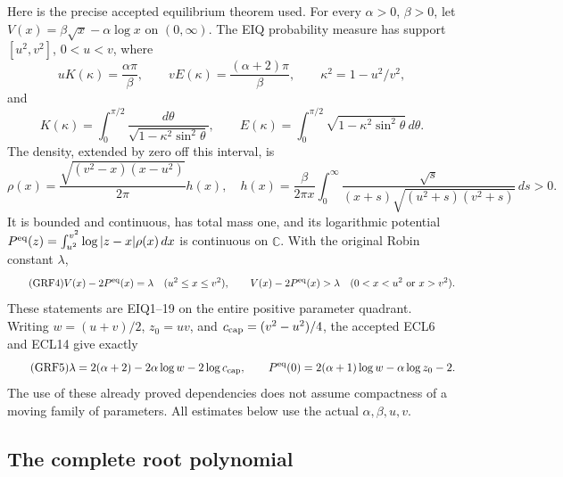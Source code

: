 \documentclass[11pt,a4paper]{article}
\begin{document}
Here is the precise accepted equilibrium theorem used. For every
$\alpha>0$, $\beta>0$, let
$V(x)=\beta\sqrt x-\alpha\log x$ on $(0,\infty)$.
The EIQ probability measure has support $[u^2,v^2]$, $0<u<v$, where
\begin{equation*}\tag{GRF2}\label{GRF:endpoints}
 uK(\kappa)=\frac{\alpha\pi}{\beta},\qquad
 vE(\kappa)=\frac{(\alpha+2)\pi}{\beta},\qquad
 \kappa^2=1-u^2/v^2,
\end{equation*}
and
\[
 K(\kappa)=\int_0^{\pi/2}\frac{d\theta}
                 {\sqrt{1-\kappa^2\sin^2\theta}},\qquad
 E(\kappa)=\int_0^{\pi/2}
                 \sqrt{1-\kappa^2\sin^2\theta}\,d\theta.
\]
The density, extended by zero off this interval, is
\begin{equation*}\tag{GRF3}\label{GRF:eiqdensity}
 \rho(x)=\frac{\sqrt{(v^2-x)(x-u^2)}}{2\pi}h(x),\quad
 h(x)=\frac{\beta}{2\pi x}
 \int_0^\infty
 \frac{\sqrt s}{(x+s)\sqrt{(u^2+s)(v^2+s)}}\,d s>0.
\end{equation*}
It is bounded and continuous, has total mass one, and its logarithmic
potential
$P^{\rm eq}(z)=\int_{u^2}^{v^2}\log|z-x|\rho(x)\,d x$
is continuous on $\mathbb C$. With the original Robin constant $\lambda$,
\begin{equation*}\tag{GRF4}\label{GRF:euler}
 V(x)-2P^{\rm eq}(x)=\lambda\quad(u^2\le x\le v^2),
 \qquad V(x)-2P^{\rm eq}(x)>\lambda
 \quad(0<x<u^2\ \text{or}\ x>v^2).
\end{equation*}
These statements are EIQ1--19 on the entire positive parameter quadrant.
Writing $w=(u+v)/2$, $z_0=uv$, and
$c_{\rm cap}=(v^2-u^2)/4$, the accepted ECL6 and ECL14 give exactly
\begin{equation*}\tag{GRF5}\label{GRF:ecl}
 \lambda=2(\alpha+2)-2\alpha\log w-2\log c_{\rm cap},
 \qquad
 P^{\rm eq}(0)=2(\alpha+1)\log w-\alpha\log z_0-2.
\end{equation*}
The use of these already proved dependencies does not assume compactness
of a moving family of parameters. All estimates below use the actual
$\alpha,\beta,u,v$.

\subsection{The complete root polynomial}
\end{document}
